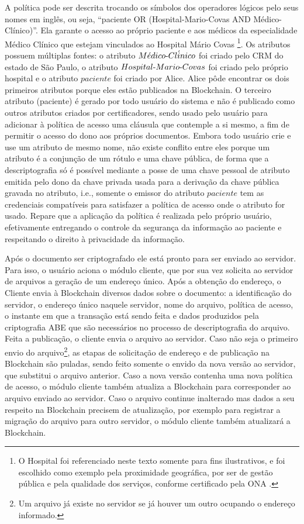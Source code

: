 \documentclass[a4paper,11pt]{article}
\begin{document}
A política pode ser descrita trocando os símbolos dos operadores lógicos pelo seus nomes em inglês, ou seja, ``paciente OR (Hospital-Mario-Covas AND Médico-Clínico)''.
Ela garante o acesso ao próprio paciente e aos médicos da especialidade Médico Clínico que estejam vinculados ao Hospital Mário Covas
\footnote{O Hospital foi referenciado neste texto somente para fins ilustrativos, e foi escolhido como exemplo pela proximidade geográfica, por ser de gestão pública e pela qualidade dos serviços, conforme certificado pela ONA \cite{ONA2020}.}.
Os atributos possuem múltiplas fontes: o atributo $M\acute{e}dico\textnormal{-}Cl\acute{i}nico$ foi criado pelo CRM do estado de São Paulo, o atributo $Hospital\textnormal{-}Mario\textnormal{-}Covas$ foi criado pelo próprio hospital e o atributo $paciente$ foi criado por Alice.
Alice pôde encontrar os dois primeiros atributos porque eles estão publicados na Blockchain.
O terceiro atributo (paciente) é gerado por todo usuário do sistema e não é publicado como outros atributos criados por certificadores, sendo usado pelo usuário para adicionar à política de acesso uma cláusula que contemple a si mesmo, a fim de permitir o acesso do dono aos próprios documentos.
Embora todo usuário crie e use um atributo de mesmo nome, não existe conflito entre eles porque um atributo é a conjunção de um rótulo e uma chave pública, de forma que a descriptografia só é possível mediante a posse de uma chave pessoal de atributo emitida pelo dono da chave privada usada para a derivação da chave pública gravada no atributo, i.e., somente o emissor do atributo $paciente$ tem as credenciais compatíveis para satisfazer a política de acesso onde o atributo for usado.
Repare que a aplicação da política é realizada pelo próprio usuário, efetivamente entregando o controle da segurança da informação ao paciente e respeitando o direito à privacidade da informação.

Após o documento ser criptografado ele está pronto para ser enviado ao servidor.
Para isso, o usuário aciona o módulo cliente, que por sua vez solicita ao servidor de arquivos a geração de um endereço único.
Após a obtenção do endereço, o Cliente envia à Blockchain diversos dados sobre o documento: a identificação do servidor, o endereço único naquele servidor, nome do arquivo, política de acesso, o instante em que a transação está sendo feita e dados produzidos pela criptografia ABE que são necessários no processo de descriptografia do arquivo.
Feita a publicação, o cliente envia o arquivo ao servidor.
Caso não seja o primeiro envio do arquivo\footnote{Um arquivo já existe no servidor se já houver um outro ocupando o endereço informado.}, as etapas de solicitação de endereço e de publicação na Blockchain são puladas, sendo feito somente o envido da nova versão ao servidor, que substitui o arquivo anterior.
Caso a nova versão contenha uma nova política de acesso, o módulo cliente também atualiza a Blockchain para corresponder ao arquivo enviado ao servidor.
Caso o arquivo continue inalterado mas dados a seu respeito na Blockchain precisem de atualização, por exemplo para registrar a migração do arquivo para outro servidor, o módulo cliente também atualizará a Blockchain.
\end{document}
